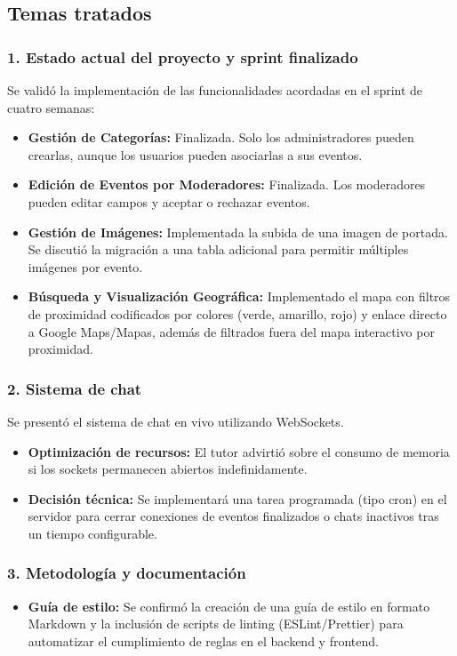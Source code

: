 \subsection*{Temas tratados}

\subsubsection*{1. Estado actual del proyecto y sprint finalizado}
Se validó la implementación de las funcionalidades acordadas en el sprint de cuatro semanas:

\begin{itemize}
    \item \textbf{Gestión de Categorías:} Finalizada. Solo los administradores pueden crearlas, aunque los usuarios pueden asociarlas a sus eventos.
    \item \textbf{Edición de Eventos por Moderadores:} Finalizada. Los moderadores pueden editar campos y aceptar o rechazar eventos.
    \item \textbf{Gestión de Imágenes:} Implementada la subida de una imagen de portada. Se discutió la migración a una tabla adicional para permitir múltiples imágenes por evento.
    \item \textbf{Búsqueda y Visualización Geográfica:} Implementado el mapa con filtros de proximidad codificados por colores (verde, amarillo, rojo) y enlace directo a Google Maps/Mapas, además de filtrados fuera del mapa interactivo por proximidad.
\end{itemize}

\subsubsection*{2. Sistema de chat}
Se presentó el sistema de chat en vivo utilizando WebSockets.

\begin{itemize}
    \item \textbf{Optimización de recursos:} El tutor advirtió sobre el consumo de memoria si los sockets permanecen abiertos indefinidamente.
    \item \textbf{Decisión técnica:} Se implementará una tarea programada (tipo cron) en el servidor para cerrar conexiones de eventos finalizados o chats inactivos tras un tiempo configurable.
\end{itemize}

\subsubsection*{3. Metodología y documentación}
\begin{itemize}
    \item \textbf{Guía de estilo:} Se confirmó la creación de una guía de estilo en formato Markdown y la inclusión de scripts de linting (ESLint/Prettier) para automatizar el cumplimiento de reglas en el backend y frontend.
\end{itemize}

